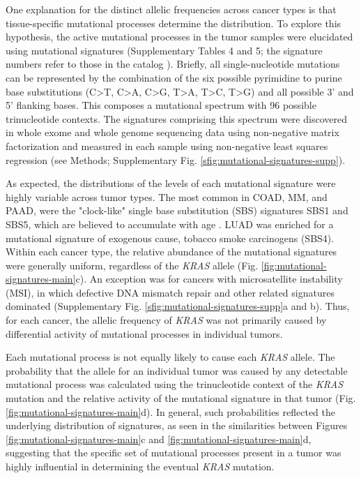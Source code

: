 \documentclass[english, 10pt, letterpaper]{article}
\newcommand{\KRAS}{\emph{KRAS}}
\begin{document}
One explanation for the distinct allelic frequencies across cancer types is that tissue-specific mutational processes determine the distribution.
To explore this hypothesis, the active mutational processes in the tumor samples were elucidated using mutational signatures \cite{Alexandrov2013} (Supplementary Tables 4 and 5; the signature numbers refer to those in the catalog \cite{Alexandrov2020TheCancer.}). 
Briefly, all single-nucleotide mutations can be represented by the combination of the six possible pyrimidine to purine base substitutions (C>T, C>A, C>G, T>A, T>C, T>G) and all possible 3’ and 5’ flanking bases. 
This composes a mutational spectrum with 96 possible trinucleotide contexts. 
The signatures comprising this spectrum were discovered in whole exome and whole genome sequencing data using non-negative matrix factorization and measured in each sample using non-negative least squares regression (see Methods; Supplementary Fig. \ref{sfig:mutational-signatures-supp}).

As expected, the distributions of the levels of each mutational signature were highly variable across tumor types.
The most common in COAD, MM, and PAAD, were the "clock-like" single base substitution (SBS) signatures SBS1 and SBS5, which are believed to accumulate with age \cite{Alexandrov2015}. 
LUAD was enriched for a mutational signature of exogenous cause, tobacco smoke carcinogens (SBS4). 
Within each cancer type, the relative abundance of the mutational signatures were generally uniform, regardless of the \KRAS{} allele (Fig. \ref{fig:mutational-signatures-main}c). 
An exception was for cancers with microsatellite instability (MSI), in which defective DNA mismatch repair and other related signatures dominated (Supplementary Fig. \ref{sfig:mutational-signatures-supp}a and b).
Thus, for each cancer, the allelic frequency of \KRAS{} was not primarily caused by differential activity of mutational processes in individual tumors.

Each mutational process is not equally likely to cause each \KRAS{} allele.
The probability that the allele for an individual tumor was caused by any detectable mutational process was calculated using the trinucleotide context of the \KRAS{} mutation and the relative activity of the mutational signature in that tumor (Fig. \ref{fig:mutational-signatures-main}d).
In general, such probabilities reflected the underlying distribution of signatures, as seen in the similarities between Figures \ref{fig:mutational-signatures-main}c and \ref{fig:mutational-signatures-main}d, suggesting that the specific set of mutational processes present in a tumor was highly influential in determining the eventual \KRAS{} mutation.
\end{document}
